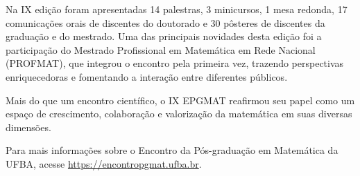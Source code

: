 \documentclass{hipatia}
\begin{document}
Na IX edição foram apresentadas 14 palestras, 3 minicursos, 1 mesa redonda, 17 comunicações orais de discentes do doutorado e 30 pôsteres de discentes da graduação e do mestrado.
Uma das principais novidades desta edição foi a participação do Mestrado Profissional em Matemática em Rede Nacional (PROFMAT), que integrou o encontro pela primeira vez, trazendo perspectivas enriquecedoras e fomentando a interação entre diferentes públicos. 
%

Mais do que um encontro científico, o IX EPGMAT reafirmou seu papel como um espaço de crescimento, colaboração e valorização da matemática em suas diversas dimensões.

Para mais informações sobre o Encontro da Pós-graduação em Matemática da UFBA, acesse \href{https://encontropgmat.ufba.br/}{https://encontropgmat.ufba.br}.

%

%
%
\end{document}
